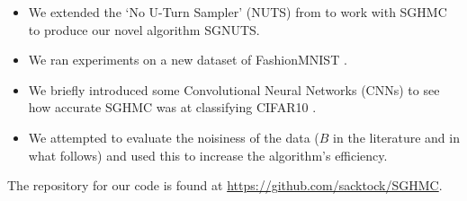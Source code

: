 \begin{itemize}
    \item We extended the `No U-Turn Sampler' (NUTS) from \cite{nuts} to work with SGHMC to produce our novel algorithm SGNUTS.
    \item We ran experiments on a new dataset of FashionMNIST \cite{fashion-mnist}.
    \item We briefly introduced some Convolutional Neural Networks (CNNs) to see how accurate SGHMC was at classifying CIFAR10 \cite{cifar10}.
    \item We attempted to evaluate the noisiness of the data ($B$ in the literature and in what follows) and used this to increase the algorithm's efficiency.
\end{itemize}

The repository for our code is found at \url{https://github.com/sacktock/SGHMC}.
